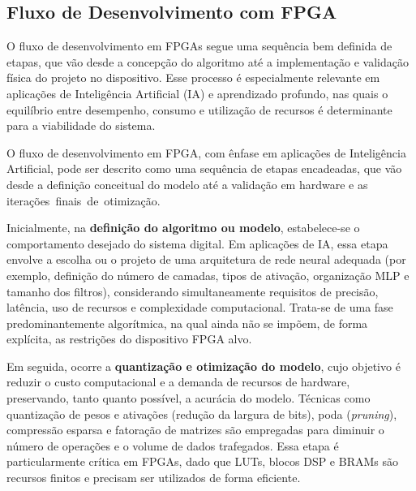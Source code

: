 


\subsection*{Fluxo de Desenvolvimento com FPGA}

O fluxo de desenvolvimento em FPGAs segue uma sequência bem definida de etapas, que vão desde a concepção do algoritmo até a implementação e validação física do projeto no dispositivo. Esse processo é especialmente relevante em aplicações de Inteligência Artificial (IA) e aprendizado profundo, nas quais o equilíbrio entre desempenho, consumo e utilização de recursos é determinante para a viabilidade do sistema.

O fluxo de desenvolvimento em FPGA, com ênfase em aplicações de Inteligência Artificial, pode ser descrito como uma sequência de etapas encadeadas, que vão desde a definição conceitual do modelo até a validação em hardware e as \mbox{iterações finais de otimização.}

Inicialmente, na \textbf{definição do algoritmo ou modelo}, estabelece-se o comportamento desejado do sistema digital. Em aplicações de IA, essa etapa envolve a escolha ou o projeto de uma arquitetura de rede neural adequada (por exemplo, definição do número de camadas, tipos de ativação, organização MLP e tamanho dos filtros), considerando simultaneamente requisitos de precisão, latência, uso de recursos e complexidade computacional. Trata-se de uma fase predominantemente algorítmica, na qual ainda não se impõem, de forma explícita, as restrições do dispositivo FPGA alvo.

Em seguida, ocorre a \textbf{quantização e otimização do modelo}, cujo objetivo é reduzir o custo computacional e a demanda de recursos de hardware, preservando, tanto quanto possível, a acurácia do modelo. Técnicas como quantização de pesos e ativações (redução da largura de bits), poda (\textit{pruning}), compressão esparsa e fatoração de matrizes são empregadas para diminuir o número de operações e o volume de dados trafegados. Essa etapa é particularmente crítica em FPGAs, dado que LUTs, blocos DSP e BRAMs são recursos finitos e precisam ser utilizados de forma eficiente.

